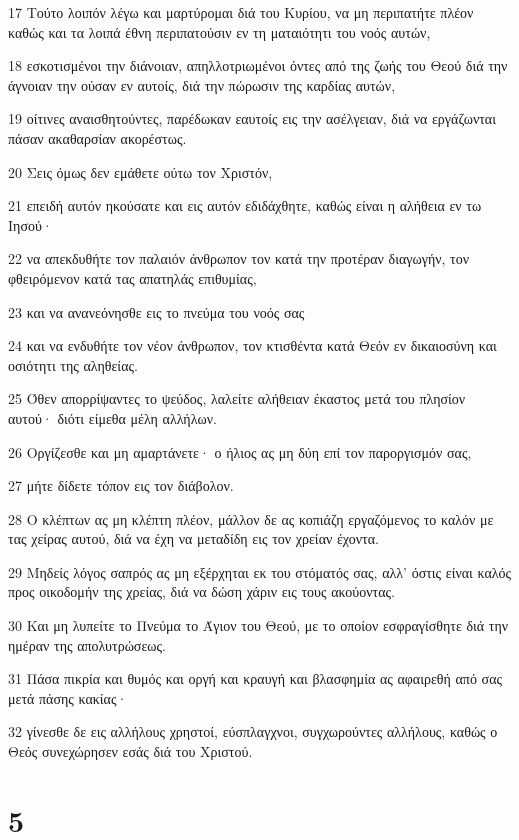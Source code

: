 \par 17 Τούτο λοιπόν λέγω και μαρτύρομαι διά του Κυρίου, να μη περιπατήτε πλέον καθώς και τα λοιπά έθνη περιπατούσιν εν τη ματαιότητι του νοός αυτών,
\par 18 εσκοτισμένοι την διάνοιαν, απηλλοτριωμένοι όντες από της ζωής του Θεού διά την άγνοιαν την ούσαν εν αυτοίς, διά την πώρωσιν της καρδίας αυτών,
\par 19 οίτινες αναισθητούντες, παρέδωκαν εαυτοίς εις την ασέλγειαν, διά να εργάζωνται πάσαν ακαθαρσίαν ακορέστως.
\par 20 Σεις όμως δεν εμάθετε ούτω τον Χριστόν,
\par 21 επειδή αυτόν ηκούσατε και εις αυτόν εδιδάχθητε, καθώς είναι η αλήθεια εν τω Ιησού·
\par 22 να απεκδυθήτε τον παλαιόν άνθρωπον τον κατά την προτέραν διαγωγήν, τον φθειρόμενον κατά τας απατηλάς επιθυμίας,
\par 23 και να ανανεόνησθε εις το πνεύμα του νοός σας
\par 24 και να ενδυθήτε τον νέον άνθρωπον, τον κτισθέντα κατά Θεόν εν δικαιοσύνη και οσιότητι της αληθείας.
\par 25 Όθεν απορρίψαντες το ψεύδος, λαλείτε αλήθειαν έκαστος μετά του πλησίον αυτού· διότι είμεθα μέλη αλλήλων.
\par 26 Οργίζεσθε και μη αμαρτάνετε· ο ήλιος ας μη δύη επί τον παροργισμόν σας,
\par 27 μήτε δίδετε τόπον εις τον διάβολον.
\par 28 Ο κλέπτων ας μη κλέπτη πλέον, μάλλον δε ας κοπιάζη εργαζόμενος το καλόν με τας χείρας αυτού, διά να έχη να μεταδίδη εις τον χρείαν έχοντα.
\par 29 Μηδείς λόγος σαπρός ας μη εξέρχηται εκ του στόματός σας, αλλ' όστις είναι καλός προς οικοδομήν της χρείας, διά να δώση χάριν εις τους ακούοντας.
\par 30 Και μη λυπείτε το Πνεύμα το Άγιον του Θεού, με το οποίον εσφραγίσθητε διά την ημέραν της απολυτρώσεως.
\par 31 Πάσα πικρία και θυμός και οργή και κραυγή και βλασφημία ας αφαιρεθή από σας μετά πάσης κακίας·
\par 32 γίνεσθε δε εις αλλήλους χρηστοί, εύσπλαγχνοι, συγχωρούντες αλλήλους, καθώς ο Θεός συνεχώρησεν εσάς διά του Χριστού.

\chapter{5}

